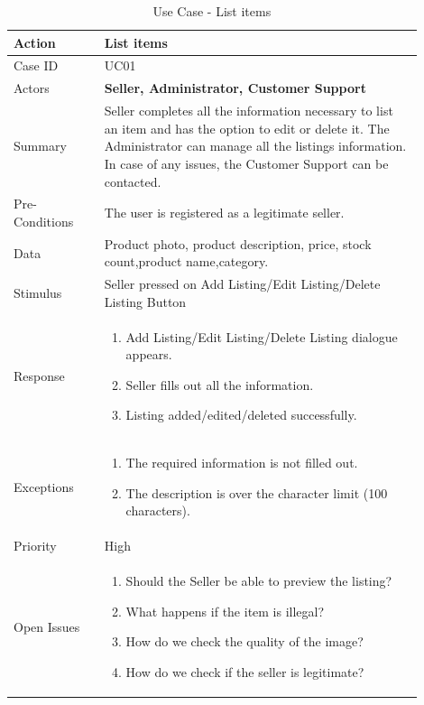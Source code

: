 \documentclass[11pt]{article}
\newcounter{use case ID}
\newcommand\tabularhead[1]{
    \begin{table}[ht]
        \addtocounter{use case ID}{1}
        \caption{Use Case \arabic{use case ID} - #1}
        \vspace{0.2cm}
        \begin{tabular}{|p{0.2\linewidth}|p{0.70\linewidth}|}
            \hline
            \textbf{Action} & \textbf{#1} \\
            \hline}
\newcommand\addrow[2]{#1 & #2\\ \hline}
\newcommand\addmulrow[2]{ \begin{minipage}[t][][t]{2.5cm}#1\end{minipage}
                &\begin{minipage}[t][][t]{11cm}
                    \begin{enumerate}[itemsep=-1ex] #2   \end{enumerate}
                \end{minipage}\vfill\\ \hline}
\newenvironment{usecase}{\tabularhead}
        {\hline\end{tabular}\end{table}}
\newcounter{req ID}
\begin{document}
\begin{usecase}{List items}
    \addrow{Case ID}{UC01}
    \addrow{Actors}{\textbf{Seller, Administrator, Customer Support}}
    \addrow{Summary}{\index{seller}Seller completes all the \index{information}information necessary to list an item and has the option to edit or delete it. The \index{administrator}Administrator can manage all the listings information. In case of any issues, the Customer Support can be contacted.}
    \addrow{Pre-Conditions}{The user is registered as a legitimate seller.}
    \addrow{\index{data}Data}{Product photo, \index{product}product description, price, stock count,product name,category.}
    \addrow{Stimulus}{Seller pressed on Add Listing/Edit Listing/Delete Listing Button}
    \addmulrow{Response}{
            \item Add Listing/Edit Listing/Delete Listing dialogue appears.
            \item \index{seller}Seller fills out all the information.
            \item Listing added/edited/deleted successfully.
    }
    \addmulrow{Exceptions}{
            \item The required information is not filled out.
            \item The description is over the character limit (100 characters).
    }
    \addrow{Priority}{High}
    \addmulrow{Open Issues}{
            \item Should the \index{seller}Seller be able to preview the listing?
            \item What happens if the item is illegal?
            \item How do we check the quality of the image?
            \item How do we check if the seller is legitimate?
    }
\end{usecase}
\end{document}
